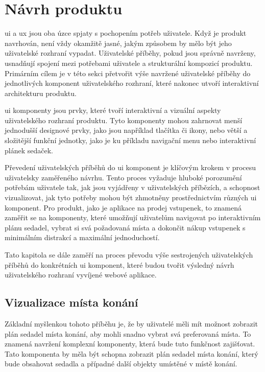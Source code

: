 \section{Návrh produktu}
\label{sec:navrh-ui-navrh-produktu}
\acl{ui} a \acl{ux} jsou oba úzce spjaty s pochopením potřeb uživatele.
Když je produkt navrhován, není vždy okamžitě jasné, jakým způsobem by mělo být jeho uživatelské rozhraní vypadat.
Uživatelské příběhy, pokud jsou správně navrženy, usnadňují spojení mezi potřebami uživatele a strukturální kompozicí produktu.
Primárním cílem je v této sekci přetvořit výše navržené uživatelské příběhy do jednotlivých komponent uživatelského rozhraní, které nakonec utvoří interaktivní architekturu produktu.

\ac{ui} komponenty jsou prvky, které tvoří interaktivní a vizuální aspekty uživatelského rozhraní produktu.
Tyto komponenty mohou zahrnovat menší jednodušší designové prvky, jako jsou například tlačítka či ikony, nebo větší a složitější funkční jednotky, jako je ku příkladu navigační menu nebo interaktivní plánek sedaček.

Převedení uživatelských příběhů do \ac{ui} komponent je klíčovým krokem v procesu uživatelsky zaměřeného návrhu.
Tento proces vyžaduje hluboké porozumění potřebám uživatele tak, jak jsou vyjádřeny v uživatelských příbězích, a schopnost vizualizovat, jak tyto potřeby mohou být zhmotněny prostřednictvím různých \ac{ui} komponent.
Pro produkt, jako je aplikace na prodej vstupenek, to znamená zaměřit se na komponenty, které umožňují uživatelům navigovat po interaktivním plánu sedadel, vybrat si svá požadovaná místa a dokončit nákup vstupenek s minimálním distrakcí a maximální jednoduchostí.

Tato kapitola se dále zaměří na proces převodu výše sestrojených uživatelských příběhů do konkrétních \ac{ui} komponent, které budou tvořit výsledný návrh uživatelského rozhraní vyvíjené webové aplikace.

\subsection{Vizualizace místa konání}
\label{subsec:narvh-ui-transformace-uzivatelskych-pribehu-vizualizace-mista-konani}
\userstoryvenuemap

Základní myšlenkou tohoto příběhu je, že by uživatelé měli mít možnost zobrazit plán sedadel místa konání, aby mohli snadno vybrat svá preferovaná místa.
To znamená navržení komplexní komponenty, která bude tuto funkčnost zajišťovat.
Tato komponenta by měla být schopna zobrazit plán sedadel místa konání, který bude obsahovat sedadla a případné další objekty umístěné v místě konání.


